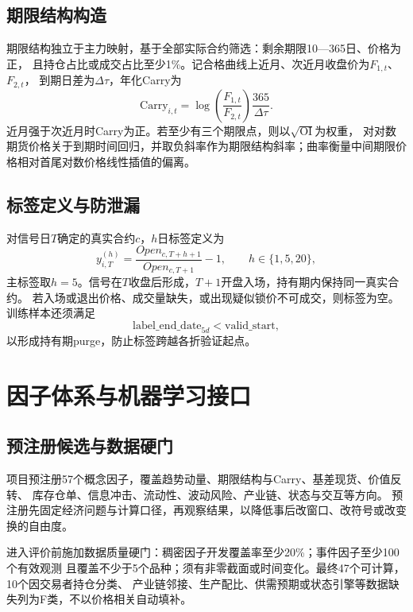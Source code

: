 \documentclass[UTF8,zihao=-4,fontset=ubuntu]{ctexart}
\begin{document}
\subsection{期限结构构造}

期限结构独立于主力映射，基于全部实际合约筛选：剩余期限10—365日、价格为正，
且持仓占比或成交占比至少1\%。记合格曲线上近月、次近月收盘价为$F_{1,t}$、$F_{2,t}$，
到期日差为$\Delta\tau$，年化Carry为
\begin{equation}
\mathrm{Carry}_{i,t}=\log\!\left(\frac{F_{1,t}}{F_{2,t}}\right)\frac{365}{\Delta\tau}.
\end{equation}
近月强于次近月时Carry为正。若至少有三个期限点，则以$\sqrt{\mathrm{OI}}$为权重，
对对数期货价格关于到期时间回归，并取负斜率作为期限结构斜率；曲率衡量中间期限价格相对首尾对数价格线性插值的偏离。

\subsection{标签定义与防泄漏}

对信号日$T$确定的真实合约$c$，$h$日标签定义为
\begin{equation}
y^{(h)}_{i,T}=\frac{Open_{c,T+h+1}}{Open_{c,T+1}}-1,\qquad h\in\{1,5,20\},
\end{equation}
主标签取$h=5$。信号在$T$收盘后形成，$T+1$开盘入场，持有期内保持同一真实合约。
若入场或退出价格、成交量缺失，或出现疑似锁价不可成交，则标签为空。训练样本还须满足
\begin{equation}
\mathrm{label\_end\_date}_{5d}<\mathrm{valid\_start},
\end{equation}
以形成持有期purge，防止标签跨越各折验证起点。
\section{因子体系与机器学习接口}

\subsection{预注册候选与数据硬门}

项目预注册57个概念因子，覆盖趋势动量、期限结构与Carry、基差现货、价值反转、
库存仓单、信息冲击、流动性、波动风险、产业链、状态与交互等方向。
预注册先固定经济问题与计算口径，再观察结果，以降低事后改窗口、改符号或改变换的自由度。

进入评价前施加数据质量硬门：稠密因子开发覆盖率至少20\%；事件因子至少100个有效观测
且覆盖不少于5个品种；须有非零截面或时间变化。最终47个可计算，10个因交易者持仓分类、
产业链邻接、生产配比、供需预期或状态引擎等数据缺失列为F类，不以价格相关自动填补。
\end{document}
